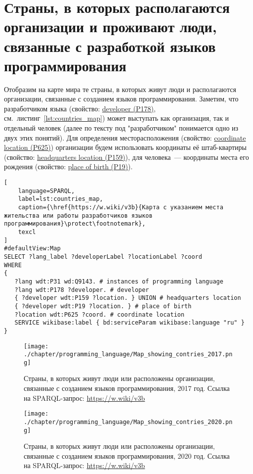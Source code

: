 \section{Страны, в которых располагаются организации и проживают люди, связанные с разработкой языков программирования}

Отобразим на карте мира те страны, в которых живут люди и располагаются организации, связанные с созданием языков программирования. Заметим, что разработчиком языка (свойство: \href{https://www.wikidata.org/wiki/Property:P178}{developer (P178)}, см.~листинг~\ref{lst:countries_map}) может выступать как организация, так и отдельный человек (далее по тексту под "разработчиком" понимается одно из двух этих понятий). Для определения месторасположения (свойство: \href{https://www.wikidata.org/wiki/Property:P625}{coordinate location (P625)}) организации будем использовать координаты её штаб-квартиры (свойство: \href{https://www.wikidata.org/wiki/Property:P159}{headquarters location (P159)}), для человека~--- координаты места его рождения (свойство: \href{https://www.wikidata.org/wiki/Property:P19}{place of birth (P19)}).

\begin{lstlisting}[
	language=SPARQL,
	label=lst:countries_map,
	caption={\href{https://w.wiki/v3b}{Карта с указанием места жительства или работы разработчиков языков программирования}\protect\footnotemark},
	texcl
]
#defaultView:Map
SELECT ?lang_label ?developerLabel ?locationLabel ?coord
WHERE
{
   ?lang wdt:P31 wd:Q9143. # instances of programming language
   ?lang wdt:P178 ?developer. # developer
   { ?developer wdt:P159 ?location. } UNION # headquarters location
   { ?developer wdt:P19 ?location. } # place of birth
   ?location wdt:P625 ?coord. # coordinate location
   SERVICE wikibase:label { bd:serviceParam wikibase:language "ru" } 	
}
\end{lstlisting}

\begin{figure}[h]
\centering
	\texttt{[image: ./chapter/programming\_language/Map\_showing\_contries\_2017.png]}
	\caption{Страны, в которых живут люди или расположены организации, связанные с созданием языков программирования, 2017 год. Ссылка на SPARQL-запрос: \href{https://w.wiki/v3b}{https://w.wiki/v3b}}
	\label{fig:countries_2017}
\end{figure}
\begin{figure}
\centering
	\texttt{[image: ./chapter/programming\_language/Map\_showing\_contries\_2020.png]}
	\caption{Страны, в которых живут люди или расположены организации, связанные с созданием языков программирования, 2020 год. Ссылка на SPARQL-запрос: \href{https://w.wiki/v3b}{https://w.wiki/v3b}}
	\label{fig:countries_2020}
\end{figure}


